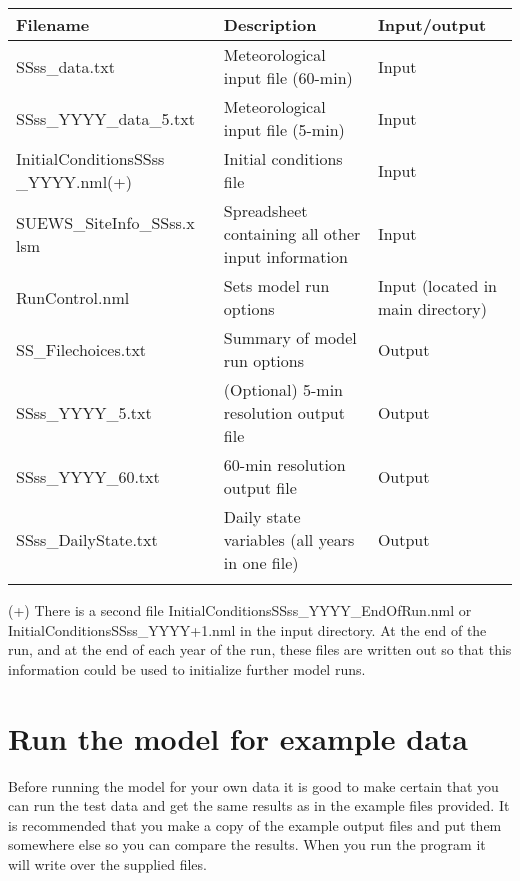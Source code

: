\documentclass[letterpaper,10pt,english]{sphinxmanual}
\begin{document}
\begin{savenotes}\sphinxattablestart
\centering
\begin{tabulary}{\linewidth}[t]{|T|T|T|}
\hline
\sphinxstyletheadfamily 
Filename
&\sphinxstyletheadfamily 
Description
&\sphinxstyletheadfamily 
Input/output
\\
\hline
SSss\_data.txt
&
Meteorological input
file (60-min)
&
Input
\\
\hline
SSss\_YYYY\_data\_5.txt
&
Meteorological input
file (5-min)
&
Input
\\
\hline
InitialConditionsSSss
\_YYYY.nml(+)
&
Initial conditions
file
&
Input
\\
\hline
SUEWS\_SiteInfo\_SSss.x
lsm
&
Spreadsheet
containing all other
input information
&
Input
\\
\hline
RunControl.nml
&
Sets model run
options
&
Input (located in
main directory)
\\
\hline
SS\_Filechoices.txt
&
Summary of model run
options
&
Output
\\
\hline
SSss\_YYYY\_5.txt
&
(Optional) 5-min
resolution output
file
&
Output
\\
\hline
SSss\_YYYY\_60.txt
&
60-min resolution
output file
&
Output
\\
\hline
SSss\_DailyState.txt
&
Daily state variables
(all years in one
file)
&
Output
\\
\hline&&\\
\hline
\end{tabulary}
\par
\sphinxattableend\end{savenotes}

(+) There is a second file InitialConditionsSSss\_YYYY\_EndOfRun.nml or
InitialConditionsSSss\_YYYY+1.nml in the input directory. At the end of
the run, and at the end of each year of the run, these files are written
out so that this information could be used to initialize further model
runs.


\section{Run the model for example data}
\label{\detokenize{prepare-to-run-the-model:run-the-model-for-example-data}}
Before running the model for your own data it is good to make certain
that you can run the test data and get the same results as in the
example files provided. It is recommended that you make a copy of the
example output files and put them somewhere else so you can compare the
results. When you run the program it will write over the supplied files.
\end{document}
